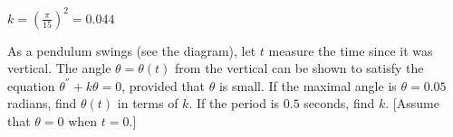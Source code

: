 \begin{multicols}{2}
\begin{ex}
\begin{sol}
$k = (\frac{\pi}{15})^2 = 0.044$
\end{sol}
\end{ex}

\begin{ex}
As a pendulum swings (see the diagram), let $t$ measure the time since it was vertical. The angle $\theta = \theta(t)$ from the vertical can be shown to satisfy the equation $\theta^\dprime + k\theta = 0$, provided that $\theta$ is small. If the maximal angle is $\theta = 0.05$ radians, find $\theta(t)$ in terms of $k$. If the period is $0.5$ seconds, find $k$. [Assume that $\theta = 0$ when $t = 0$.]

\begin{figure}[H]
	\centering
	
\end{figure}
\end{ex}
\end{multicols}
